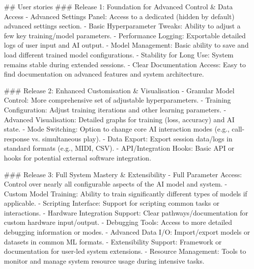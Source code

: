 ## User stories
###  Release 1: Foundation for Advanced Control & Data Access
- Advanced Settings Panel: Access to a dedicated (hidden by default) advanced settings section.
- Basic Hyperparameter Tweaks: Ability to adjust a few key training/model parameters.
- Performance Logging: Exportable detailed logs of user input and AI output.
- Model Management: Basic ability to save and load different trained model configurations.
- Stability for Long Use: System remains stable during extended sessions.
- Clear Documentation Access: Easy to find documentation on advanced features and system architecture.

###  Release 2: Enhanced Customisation & Visualisation
- Granular Model Control: More comprehensive set of adjustable hyperparameters.
- Training Configuration: Adjust training iterations and other learning parameters.
- Advanced Visualisation: Detailed graphs for training (loss, accuracy) and AI state.
- Mode Switching: Option to change core AI interaction modes (e.g., call-response vs. simultaneous play).
- Data Export: Export session data/logs in standard formats (e.g., MIDI, CSV).
- API/Integration Hooks: Basic API or hooks for potential external software integration.

###  Release 3: Full System Mastery & Extensibility
- Full Parameter Access: Control over nearly all configurable aspects of the AI model and system.
- Custom Model Training: Ability to train significantly different types of models if applicable.
- Scripting Interface: Support for scripting common tasks or interactions.
- Hardware Integration Support: Clear pathways/documentation for custom hardware input/output.
- Debugging Tools: Access to more detailed debugging information or modes.
- Advanced Data I/O: Import/export models or datasets in common ML formats.
- Extensibility Support: Framework or documentation for user-led system extensions.
- Resource Management: Tools to monitor and manage system resource usage during intensive tasks. 